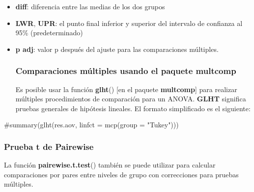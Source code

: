 \documentclass[
  letterpaper,
  DIV=11,
  numbers=noendperiod]{scrartcl}
\newenvironment{Shaded}{\begin{snugshade}}{\end{snugshade}}
\newcommand{\AttributeTok}[1]{\textcolor[rgb]{0.40,0.45,0.13}{#1}}
\newcommand{\CommentTok}[1]{\textcolor[rgb]{0.37,0.37,0.37}{#1}}
\newcommand{\FunctionTok}[1]{\textcolor[rgb]{0.28,0.35,0.67}{#1}}
\newcommand{\NormalTok}[1]{\textcolor[rgb]{0.00,0.23,0.31}{#1}}
\newcommand{\SpecialCharTok}[1]{\textcolor[rgb]{0.37,0.37,0.37}{#1}}
\newcommand{\StringTok}[1]{\textcolor[rgb]{0.13,0.47,0.30}{#1}}
\begin{document}
\begin{itemize}
\item
  \textbf{diff}: diferencia entre las medias de los dos grupos
\item
  \textbf{LWR}, \textbf{UPR}: el punto final inferior y superior del
  intervalo de confianza al 95\% (predeterminado)
\item
  \textbf{p adj}: valor p después del ajuste para las comparaciones
  múltiples.

  \hypertarget{comparaciones-muxfaltiples-usando-el-paquete-multcomp}{%
  \subsubsection{Comparaciones múltiples usando el paquete
  multcomp}\label{comparaciones-muxfaltiples-usando-el-paquete-multcomp}}

  Es posible usar la función \textbf{glht}() {[}en el paquete
  \textbf{multcomp}{]} para realizar múltiples procedimientos de
  comparación para un ANOVA. \textbf{GLHT} significa pruebas generales
  de hipótesis lineales. El formato simplificado es el siguiente:
\end{itemize}

\begin{Shaded}
\begin{Highlighting}[]
\CommentTok{\#summary(glht(res.aov, linfct = mcp(group = "Tukey")))}
\end{Highlighting}
\end{Shaded}

\hypertarget{prueba-t-de-pairewise}{%
\subsubsection{Prueba t de Pairewise}\label{prueba-t-de-pairewise}}

La función \textbf{pairewise.t.test}() también se puede utilizar para
calcular comparaciones por pares entre niveles de grupo con correcciones
para pruebas múltiples.

\begin{Shaded}
\end{Shaded}
\end{document}
